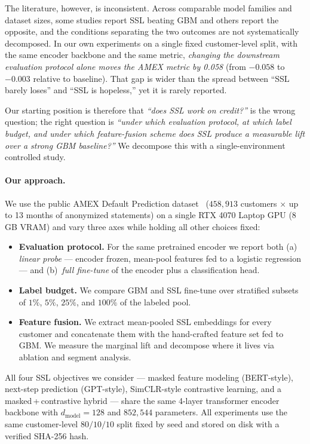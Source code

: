 \documentclass[sigconf, anonymous, review]{acmart}
\begin{document}
The literature, however, is inconsistent. Across comparable model
families and dataset sizes, some studies report SSL beating GBM and
others report the opposite, and the conditions separating the two
outcomes are not systematically decomposed. In our own experiments on
a single fixed customer-level split, with the same encoder backbone
and the same metric, \emph{changing the downstream evaluation protocol
alone moves the AMEX metric by 0.058} (from $-0.058$ to $-0.003$
relative to baseline). That gap is wider than the spread between
``SSL barely loses'' and ``SSL is hopeless,'' yet it is rarely reported.

Our starting position is therefore that \emph{``does SSL work on
credit?''} is the wrong question; the right question is \emph{``under
which evaluation protocol, at which label budget, and under which
feature-fusion scheme does SSL produce a measurable lift over a strong
GBM baseline?''} We decompose this with a single-environment
controlled study.

\paragraph{Our approach.}
We use the public AMEX Default Prediction dataset~\cite{Kaggle2022}
($458{,}913$ customers $\times$ up to 13 months of anonymized
statements) on a single RTX 4070 Laptop GPU (8\,GB VRAM) and vary
three axes while holding all other choices fixed:
\begin{itemize}
  \item \textbf{Evaluation protocol.} For the same pretrained encoder
        we report both (a) \emph{linear probe} --- encoder frozen,
        mean-pool features fed to a logistic regression --- and
        (b)~\emph{full fine-tune} of the encoder plus a classification
        head.
  \item \textbf{Label budget.} We compare GBM and SSL fine-tune over
        stratified subsets of $1\%$, $5\%$, $25\%$, and $100\%$ of the
        labeled pool.
  \item \textbf{Feature fusion.} We extract mean-pooled SSL embeddings
        for every customer and concatenate them with the hand-crafted
        feature set fed to GBM. We measure the marginal lift and
        decompose where it lives via ablation and segment analysis.
\end{itemize}
All four SSL objectives we consider --- masked feature modeling
(BERT-style), next-step prediction (GPT-style), SimCLR-style
contrastive learning, and a masked\,+\,contrastive hybrid --- share
the same 4-layer transformer encoder backbone with $d_{\text{model}}
= 128$ and $852{,}544$ parameters. All experiments use the same
customer-level $80/10/10$ split fixed by seed and stored on disk with
a verified SHA-256 hash.
\end{document}
